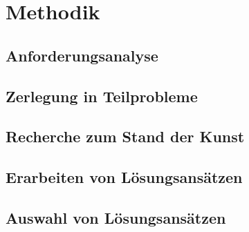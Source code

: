 \chapter{Methodik}
\label{chap:methodik}

\section{Anforderungsanalyse}

\section{Zerlegung in Teilprobleme}

\section{Recherche zum Stand der Kunst}

\section{Erarbeiten von Lösungsansätzen}

\section{Auswahl von Lösungsansätzen}

